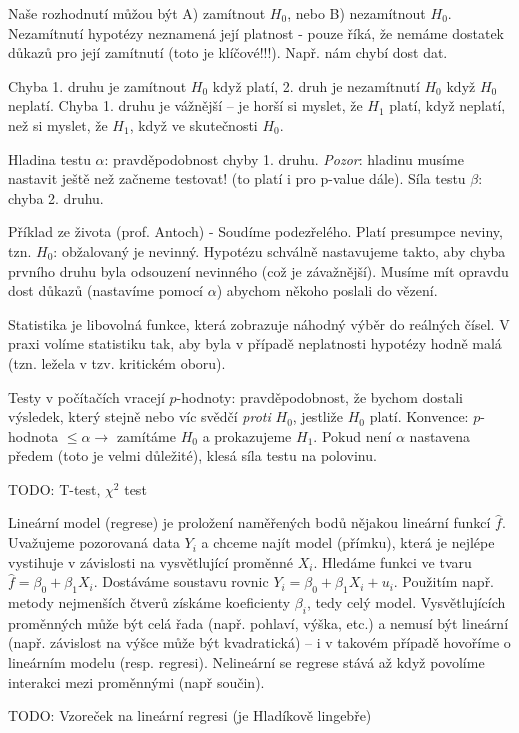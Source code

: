 \documentclass[a4paper,10pt,titlepage]{article} \usepackage[utf8]{inputenc}
\begin{document}
Naše rozhodnutí můžou být A) zamítnout $H_0$, nebo B) nezamítnout $H_0$.
Nezamítnutí hypotézy neznamená její platnost - pouze říká, že nemáme dostatek
důkazů pro její zamítnutí (toto je klíčové!!!). Např. nám chybí dost dat.

Chyba 1. druhu je zamítnout $H_0$ když platí, 2. druh je nezamítnutí $H_0$
když $H_0$ neplatí. Chyba 1. druhu je vážnější -- je horší si myslet,
že $H_1$ platí, když neplatí, než si myslet, že $H_1$, když ve skutečnosti
$H_0$.

Hladina testu $\alpha$: pravděpodobnost chyby 1. druhu. \emph{Pozor}: hladinu
musíme nastavit ještě než začneme testovat! (to platí i pro p-value dále).
Síla testu $\beta$: chyba 2. druhu.

Příklad ze života (prof. Antoch) - Soudíme podezřelého. Platí presumpce neviny,
tzn. $H_0$: obžalovaný je nevinný. Hypotézu schválně nastavujeme takto, aby
chyba prvního druhu byla odsouzení nevinného (což je závažnější). Musíme mít
opravdu dost důkazů (nastavíme pomocí $\alpha$) abychom někoho poslali do vězení.

Statistika je libovolná funkce, která zobrazuje náhodný výběr do reálných čísel.
V praxi volíme statistiku tak, aby byla v případě neplatnosti hypotézy hodně malá
(tzn. ležela v tzv. kritickém oboru).

Testy v počítačích vracejí $p$-hodnoty: pravděpodobnost, že bychom dostali
výsledek, který stejně nebo víc svědčí \emph{proti} $H_0$, jestliže $H_0$ platí.
Konvence: $p$-hodnota $\leq\alpha\longrightarrow$ zamítáme $H_0$ a prokazujeme
$H_1$. Pokud není $\alpha$ nastavena předem (toto je velmi důležité), klesá
síla testu na polovinu.

TODO: T-test, $\chi^2$ test

Lineární model (regrese) je proložení naměřených bodů nějakou lineární funkcí
$\hat{f}$.
Uvažujeme pozorovaná data $Y_i$ a chceme najít model (přímku), která je
nejlépe vystihuje v závislosti na vysvětlující proměnné $X_i$.
Hledáme funkci ve tvaru $\hat{f}=\beta_0 + \beta_1X_i$. Dostáváme soustavu rovnic
$Y_i = \beta_0 + \beta_1X_i + u_i$. Použitím např. metody nejmenších čtverů získáme
koeficienty $\beta_i$, tedy celý model. Vysvětlujících proměnných může být celá řada
(např. pohlaví, výška, etc.) a nemusí být lineární (např. závislost na výšce může
být kvadratická) -- i v takovém případě hovoříme o lineárním modelu (resp. regresi).
Nelineární se regrese stává až když povolíme interakci mezi proměnnými (např součin).

TODO: Vzoreček na lineární regresi (je Hladíkově lingebře)
\end{document}
